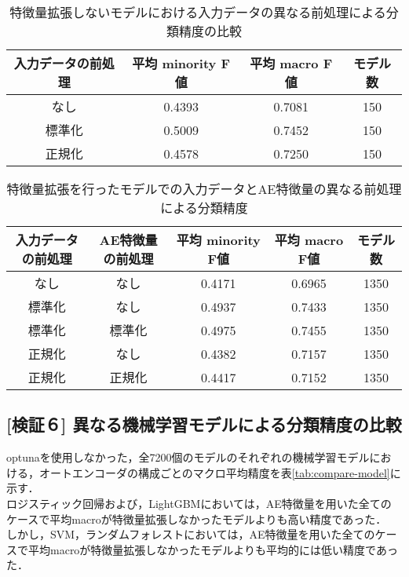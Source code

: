 \begin{table}[htbp]
    \caption{特徴量拡張しないモデルにおける入力データの異なる前処理による分類精度の比較}
    \label{tab:compare-preprocess}
    \centering
    \begin{tabular}{cccc}
        \hline
        入力データの前処理&平均 minority F値 & 平均 macro F値 & モデル数 \\ 
        \hline
        なし  & 0.4393& 0.7081 &150\\ 
        標準化  & 0.5009& 0.7452 &150\\ 
        正規化 & 0.4578& 0.7250  &150\\ 
        \hline
    \end{tabular}
\end{table}
\begin{table}[htbp]
    \caption{特徴量拡張を行ったモデルでの入力データとAE特徴量の異なる前処理による分類精度}
    \label{tab:compare-ae-preprocess}
    \centering
    \begin{tabular}{ccccc}
        \hline
        入力データの前処理& AE特徴量の前処理&平均 minority F値 & 平均 macro F値 & モデル数 \\ 
        \hline
        なし & なし & 0.4171& 0.6965 &1350\\ 
        標準化 & なし & 0.4937& 0.7433 &1350\\ 
        標準化 & 標準化 & 0.4975& 0.7455  &1350\\ 
        正規化 & なし & 0.4382& 0.7157  &1350\\ 
        正規化 & 正規化 & 0.4417& 0.7152  &1350\\ 
        \hline
    \end{tabular}
\end{table}

\subsection{[検証６] 異なる機械学習モデルによる分類精度の比較}
optunaを使用しなかった，全7200個のモデルのそれぞれの機械学習モデルにおける，オートエンコーダの構成ごとのマクロ平均精度を表\ref{tab:compare-model}に示す．\\
ロジスティック回帰および，LightGBMにおいては，AE特徴量を用いた全てのケースで平均macroが特徴量拡張しなかったモデルよりも高い精度であった．\\
しかし，SVM，ランダムフォレストにおいては，AE特徴量を用いた全てのケースで平均macroが特徴量拡張しなかったモデルよりも平均的には低い精度であった．\\

